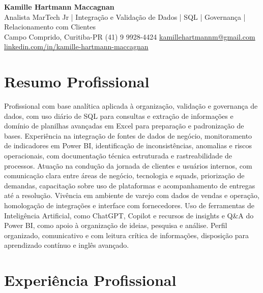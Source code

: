 \documentclass[11pt,a4paper]{article}
\newcommand{\cvheader}[4]{%
  \begin{center}
    {\LARGE\bfseries #1}\\[4pt]
    {\large #2}\\[6pt]
    #3\\[2pt]
    #4
  \end{center}
  \vspace{4pt}
}
\begin{document}
\cvheader{Kamille Hartmann Maccagnan}%
{Analista MarTech Jr | Integração e Validação de Dados | SQL | Governança | Relacionamento com Clientes}%
{Campo Comprido, Curitiba-PR \textbullet{} (41) 9 9928-4424 \textbullet{} \href{mailto:kamillehartmannm@gmail.com}{kamillehartmannm@gmail.com}}%
{\href{https://linkedin.com/in/kamille-hartmann-maccagnan/}{linkedin.com/in/kamille-hartmann-maccagnan}}

\section*{Resumo Profissional}

Profissional com base analítica aplicada à organização, validação e governança de dados, com uso diário de SQL para consultas e extração de informações e domínio de planilhas avançadas em Excel para preparação e padronização de bases. Experiência na integração de fontes de dados de negócio, monitoramento de indicadores em Power BI, identificação de inconsistências, anomalias e riscos operacionais, com documentação técnica estruturada e rastreabilidade de processos. Atuação na condução da jornada de clientes e usuários internos, com comunicação clara entre áreas de negócio, tecnologia e squads, priorização de demandas, capacitação sobre uso de plataformas e acompanhamento de entregas até a resolução. Vivência em ambiente de varejo com dados de vendas e operação, homologação de integrações e interface com fornecedores. Uso de ferramentas de Inteligência Artificial, como ChatGPT, Copilot e recursos de insights e Q\&A do Power BI, como apoio à organização de ideias, pesquisa e análise. Perfil organizado, comunicativo e com leitura crítica de informações, disposição para aprendizado contínuo e inglês avançado.

\section*{Experiência Profissional}
\end{document}
